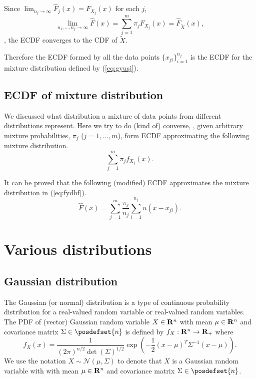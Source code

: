 Since $\lim_{n_j\to\infty} \hat{F}_j(x) = F_{X_j}(x)$ for each $j$,
\begin{equation}
\lim_{n_1, \ldots, n_j \to\infty} \hat{F}(x) = \sum_{j=1}^m \pi_j F_{X_j}(x) = \hat{F}_{\tilde{X}}(x),
\end{equation}
\ie,
the ECDF converges to the CDF of $\tilde{X}$.

Therefore the ECDF formed by all the data points $\{x_{ji}\}_{i=1}^{n_j}$
is the ECDF for the mixture distribution defined by (\ref{eq:gyusj}).


\subsection{ECDF of mixture distribution}

We discussed what distribution a mixture of data points from different distributions represent.
Here we try to do (kind of) converse,
\ie,
given arbitrary mixture probabilities, $\pi_j$ ($j=1,\ldots,m$),
form ECDF approximating the following mixture distribution.
\begin{equation}
\label{eq:fydhf}
\sum_{j=1}^m \pi_j f_{X_j}(x).
\end{equation}

It can be proved that the following (modified) ECDF approximates the mixture distribution in (\ref{eq:fydhf}).
\begin{equation}
\hat{F}(x) = \sum_{j=1}^m \frac{\pi_j}{n_j} \sum_{i=1}^{n_j} u(x- x_{ji}).
\end{equation}


\section{Various distributions}

\subsection{Gaussian distribution}

The Gaussian (or normal) distribution is a type of continuous probability distribution for a real-valued random variable
or real-valued random variables.
The PDF of (vector) Gaussian random variable $X\in\mathbf{R}^n$ with mean $\mu\in\mathbf{R}^n$ and covariance matrix $\Sigma\in\posdefset{n}$ is
defined by $f_X:\mathbf{R}^n\to{\mathbf{R}_+}$ where
\begin{equation}
\label{eq:pdf:gaussian}
f_X(x) = \frac{1}{(2\pi)^{n/2}\det(\Sigma)^{1/2}} \exp\left(
-\frac{1}{2} (x-\mu)^T \Sigma^{-1} (x-\mu)
\right).
\end{equation}
We use the notation $X\sim \mathcal{N}(\mu, \Sigma)$ to denote that $X$ is a Gaussian random variable with
with mean $\mu\in\mathbf{R}^n$ and covariance matrix $\Sigma\in\posdefset{n}$.

